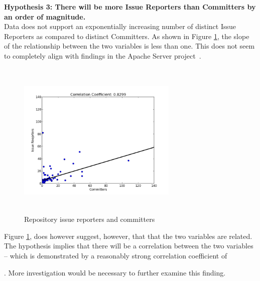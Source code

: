 \documentclass{proc}
\begin{document}
{{{{{{\noindent \textbf{Hypothesis 3: There will be more Issue Reporters than Committers by an order of magnitude.}\\
Data does not support an exponentially increasing number of distinct Issue Reporters as compared to distinct Committers. 
As shown in Figure \ref{fig:issue_reporters_committers_scatterplot}, the slope of the relationship between the two variables is less than one. This does not seem to completely align with findings in the Apache Server project~\cite{mockus2000case}. 

\begin{figure}
\includegraphics[height=3in,width=3in]{images/issue_reporters_committers_scatterplot.png}
\caption{Repository issue reporters and committers}
\label{fig:issue_reporters_committers_scatterplot}
\end{figure}

Figure \ref{fig:issue_reporters_committers_scatterplot}, does however suggest, however, that that the two variables are related. The hypothesis implies that there will be a correlation between the two variables -- which is demonstrated by a reasonably strong correlation coefficient of }\unskip. More investigation would be necessary to further examine this finding.\\

}}}}}
\end{document}
